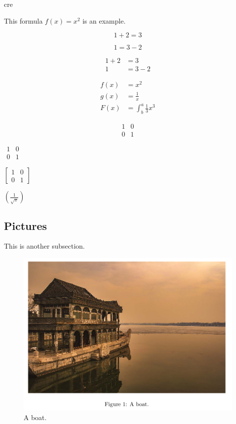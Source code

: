 cre\documentclass{article}
\begin{document}
	This formula $f(x) = x^2$ is an example.
	
	\begin{equation*}
	1 + 2 = 3
	\end{equation*}
	
	\begin{equation*}
	1 = 3 - 2
	\end{equation*}
	
	\begin{align*}
	1 + 2 &= 3\\
	1 &= 3 -2
	\end{align*}
	
	\begin{align*}
		f(x) & = x^2                     \\
		g(x) & = \frac{1}{x}             \\
		F(x) & = \int^a_b \frac{1}{3}x^3
	\end{align*}
	
	\begin{equation*}
		\begin{matrix}
			1 & 0 \\
			0 & 1
		\end{matrix}
	\end{equation*}	
		
	$\begin{matrix}
		1 & 0\\
		0 & 1
	\end{matrix}$
	
	$\left[
	\begin{matrix}
		1 & 0\\
		0 & 1
	\end{matrix}
	\right]$
	
	$ \left(\frac{1}{\sqrt{x}}\right) $
	
	\subsection{Pictures}
	  This is another subsection.
	  
	\begin{figure}[!ht]
		\includegraphics[width=\linewidth]{source/boat.jpg}
		\caption{A boat.}
		\label{fig:boat1}
	\end{figure}
	
\end{document}
